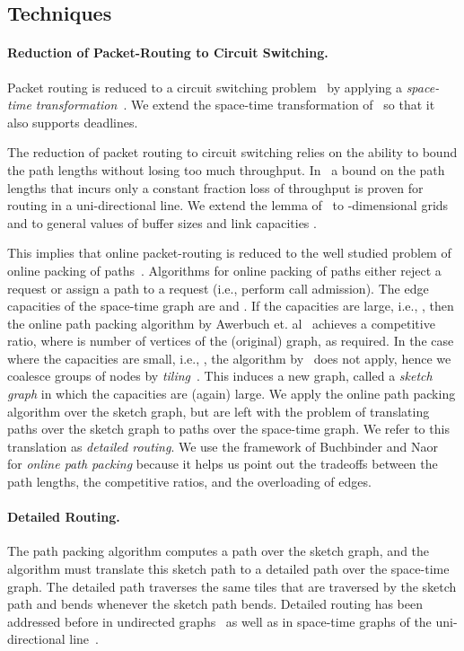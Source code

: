 \documentclass[11pt]{article}
\newenvironment{proof sketch}[1]{\noindent {\emph{Proof sketch of #1:}}}{\hfill \qed}
\begin{document}
\subsection{Techniques}\label{sec:tech}

\paragraph{Reduction of Packet-Routing to Circuit Switching.}
Packet routing is reduced to a circuit switching problem~\cite{KT,AAP} by applying a
\emph{space-time transformation}~\cite{AAF,ARSU,AZ,RR}.  We extend the space-time
transformation of~\cite{AZ} so that it also supports deadlines.

The reduction of packet routing to circuit switching relies on the ability to bound
the path lengths without losing too much throughput. In~\cite{AZ} a bound on the path
lengths that incurs only a constant fraction loss of throughput is proven for routing
in a uni-directional line. We extend the lemma of~\cite{AZ} to -dimensional grids
and to general values of buffer sizes  and link capacities .

This implies that online packet-routing is reduced to the well studied problem of
online packing of paths~\cite{AAP, BN06}.  Algorithms for online packing of paths
either reject a request or assign a path to a request (i.e., perform call admission).  The
edge capacities of the space-time graph are  and .  If the capacities are
large, i.e., , then the online path packing algorithm by Awerbuch
et. al~\cite{AAP} achieves a  competitive ratio, where  is number of
vertices of the (original) graph, as required.  In the case where the capacities are
small, i.e., , the algorithm by~\cite{AAP} does not apply, hence we
coalesce groups of nodes by \emph{tiling}~\cite{KT,BL}. This induces a new graph,
called a \emph{sketch graph} in which the capacities are (again) large.  We apply the
online path packing algorithm over the sketch graph, but are left with the problem of
translating paths over the sketch graph to paths over the space-time graph. We refer
to this translation as \emph{detailed routing}. We use the framework of Buchbinder
and Naor~\cite{BN06,BNsurvey} for \emph{online path packing} because it helps us
point out the tradeoffs between the path lengths, the competitive ratios, and the
overloading of edges.

\paragraph{Detailed Routing.}
The path packing algorithm computes a path over the sketch graph, and the algorithm
must translate this sketch path to a detailed path over the space-time graph. The
detailed path traverses the same tiles that are traversed by the sketch path and
bends whenever the sketch path bends.  Detailed routing has been addressed before in
undirected graphs~\cite{KT,BL} as well as in space-time graphs of
the uni-directional line~\cite{RR}.
\end{document}
